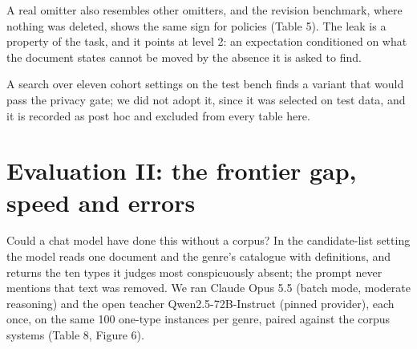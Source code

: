 \documentclass[11pt,a4paper]{article}
\begin{document}
A real omitter also resembles other omitters, and the revision benchmark, where nothing was deleted, shows the same sign for policies (Table 5). The leak is a property of the task, and it points at level 2: an expectation conditioned on what the document states cannot be moved by the absence it is asked to find.

A search over eleven cohort settings on the test bench finds a variant that would pass the privacy gate; we did not adopt it, since it was selected on test data, and it is recorded as post hoc and excluded from every table here.

\section{Evaluation II: the frontier gap, speed and errors}

Could a chat model have done this without a corpus? In the candidate-list setting the model reads one document and the genre's catalogue with definitions, and returns the ten types it judges most conspicuously absent; the prompt never mentions that text was removed. We ran Claude Opus 5.5 (batch mode, moderate reasoning) and the open teacher Qwen2.5-72B-Instruct (pinned provider), each once, on the same 100 one-type instances per genre, paired against the corpus systems (Table 8, Figure 6).
\end{document}
